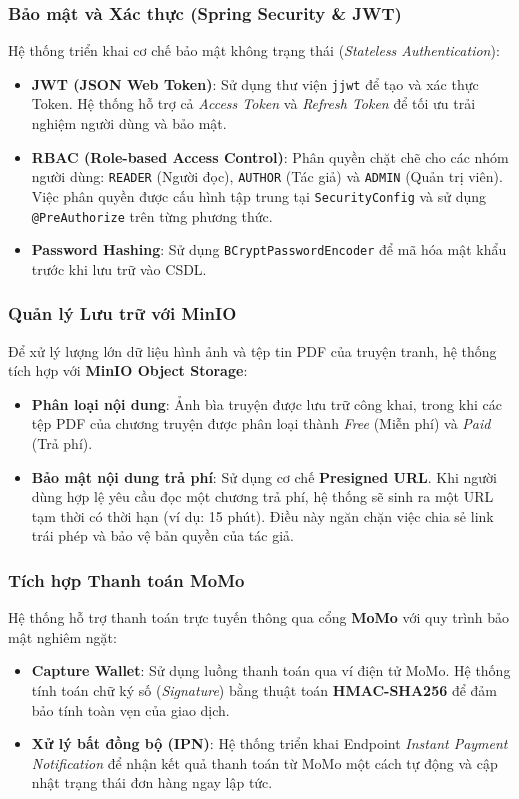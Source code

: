 \subsubsection{Bảo mật và Xác thực (Spring Security \& JWT)}
Hệ thống triển khai cơ chế bảo mật không trạng thái (\textit{Stateless Authentication}):
\begin{itemize}
    \item \textbf{JWT (JSON Web Token)}: Sử dụng thư viện \texttt{jjwt} để tạo và xác thực Token. Hệ thống hỗ trợ cả \textit{Access Token} và \textit{Refresh Token} để tối ưu trải nghiệm người dùng và bảo mật.
    \item \textbf{RBAC (Role-based Access Control)}: Phân quyền chặt chẽ cho các nhóm người dùng: \texttt{READER} (Người đọc), \texttt{AUTHOR} (Tác giả) và \texttt{ADMIN} (Quản trị viên). Việc phân quyền được cấu hình tập trung tại \texttt{SecurityConfig} và sử dụng \texttt{@PreAuthorize} trên từng phương thức.
    \item \textbf{Password Hashing}: Sử dụng \texttt{BCryptPasswordEncoder} để mã hóa mật khẩu trước khi lưu trữ vào CSDL.
\end{itemize}

\subsubsection{Quản lý Lưu trữ với MinIO}
Để xử lý lượng lớn dữ liệu hình ảnh và tệp tin PDF của truyện tranh, hệ thống tích hợp với \textbf{MinIO Object Storage}:
\begin{itemize}
    \item \textbf{Phân loại nội dung}: Ảnh bìa truyện được lưu trữ công khai, trong khi các tệp PDF của chương truyện được phân loại thành \textit{Free} (Miễn phí) và \textit{Paid} (Trả phí).
    \item \textbf{Bảo mật nội dung trả phí}: Sử dụng cơ chế \textbf{Presigned URL}. Khi người dùng hợp lệ yêu cầu đọc một chương trả phí, hệ thống sẽ sinh ra một URL tạm thời có thời hạn (ví dụ: 15 phút). Điều này ngăn chặn việc chia sẻ link trái phép và bảo vệ bản quyền của tác giả.
\end{itemize}

\subsubsection{Tích hợp Thanh toán MoMo}
Hệ thống hỗ trợ thanh toán trực tuyến thông qua cổng \textbf{MoMo} với quy trình bảo mật nghiêm ngặt:
\begin{itemize}
    \item \textbf{Capture Wallet}: Sử dụng luồng thanh toán qua ví điện tử MoMo. Hệ thống tính toán chữ ký số (\textit{Signature}) bằng thuật toán \textbf{HMAC-SHA256} để đảm bảo tính toàn vẹn của giao dịch.
    \item \textbf{Xử lý bất đồng bộ (IPN)}: Hệ thống triển khai Endpoint \textit{Instant Payment Notification} để nhận kết quả thanh toán từ MoMo một cách tự động và cập nhật trạng thái đơn hàng ngay lập tức.
\end{itemize}

